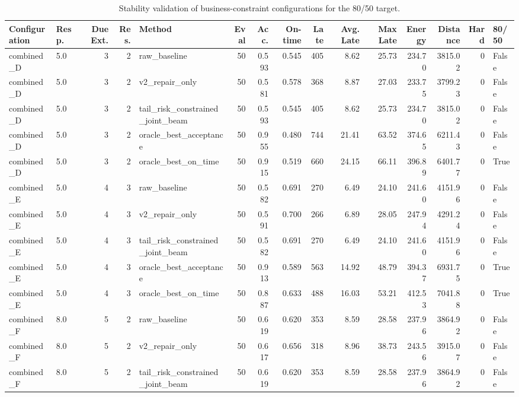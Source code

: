 \begin{table}[htbp]
\centering
\small
\setlength{\tabcolsep}{3pt}
\caption{Stability validation of business-constraint configurations for the 80/50 target.}
\label{tab:business_constraint_stability}
\begin{tabular}{llrrlrrrrrrrrrl}
\toprule
Configuration & Resp. & Due Ext. & Res. & Method & Eval & Acc. & On-time & Late & Avg. Late & Max Late & Energy & Distance & Hard & 80/50 \\
\midrule
combined\_D & 5.0 & 3 & 2 & raw\_baseline & 50 & 0.593 & 0.545 & 405 & 8.62 & 25.73 & 234.70 & 3815.02 & 0 & False \\
combined\_D & 5.0 & 3 & 2 & v2\_repair\_only & 50 & 0.581 & 0.578 & 368 & 8.87 & 27.03 & 233.75 & 3799.23 & 0 & False \\
combined\_D & 5.0 & 3 & 2 & tail\_risk\_constrained\_joint\_beam & 50 & 0.593 & 0.545 & 405 & 8.62 & 25.73 & 234.70 & 3815.02 & 0 & False \\
combined\_D & 5.0 & 3 & 2 & oracle\_best\_acceptance & 50 & 0.955 & 0.480 & 744 & 21.41 & 63.52 & 374.65 & 6211.43 & 0 & False \\
combined\_D & 5.0 & 3 & 2 & oracle\_best\_on\_time & 50 & 0.915 & 0.519 & 660 & 24.15 & 66.11 & 396.89 & 6401.77 & 0 & True \\
combined\_E & 5.0 & 4 & 3 & raw\_baseline & 50 & 0.582 & 0.691 & 270 & 6.49 & 24.10 & 241.60 & 4151.96 & 0 & False \\
combined\_E & 5.0 & 4 & 3 & v2\_repair\_only & 50 & 0.591 & 0.700 & 266 & 6.89 & 28.05 & 247.94 & 4291.24 & 0 & False \\
combined\_E & 5.0 & 4 & 3 & tail\_risk\_constrained\_joint\_beam & 50 & 0.582 & 0.691 & 270 & 6.49 & 24.10 & 241.60 & 4151.96 & 0 & False \\
combined\_E & 5.0 & 4 & 3 & oracle\_best\_acceptance & 50 & 0.913 & 0.589 & 563 & 14.92 & 48.79 & 394.37 & 6931.75 & 0 & True \\
combined\_E & 5.0 & 4 & 3 & oracle\_best\_on\_time & 50 & 0.887 & 0.633 & 488 & 16.03 & 53.21 & 412.53 & 7041.88 & 0 & True \\
combined\_F & 8.0 & 5 & 2 & raw\_baseline & 50 & 0.619 & 0.620 & 353 & 8.59 & 28.58 & 237.96 & 3864.92 & 0 & False \\
combined\_F & 8.0 & 5 & 2 & v2\_repair\_only & 50 & 0.617 & 0.656 & 318 & 8.96 & 38.73 & 243.56 & 3915.07 & 0 & False \\
combined\_F & 8.0 & 5 & 2 & tail\_risk\_constrained\_joint\_beam & 50 & 0.619 & 0.620 & 353 & 8.59 & 28.58 & 237.96 & 3864.92 & 0 & False \\

\end{tabular}
\end{table}

